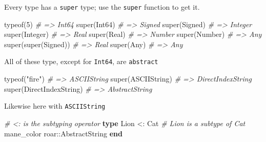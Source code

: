 \documentclass[ignorenonframetext,]{beamer}
\newenvironment{Shaded}{}{}
\newcommand{\KeywordTok}[1]{\textcolor[rgb]{0.00,0.44,0.13}{\textbf{{#1}}}}
\newcommand{\DataTypeTok}[1]{\textcolor[rgb]{0.56,0.13,0.00}{{#1}}}
\newcommand{\FloatTok}[1]{\textcolor[rgb]{0.25,0.63,0.44}{{#1}}}
\newcommand{\StringTok}[1]{\textcolor[rgb]{0.25,0.44,0.63}{{#1}}}
\newcommand{\CommentTok}[1]{\textcolor[rgb]{0.38,0.63,0.69}{\textit{{#1}}}}
\newcommand{\NormalTok}[1]{{#1}}
\begin{document}
\begin{frame}[fragile]{Every type has a \texttt{super} type; use the
\texttt{super} function to get it.}

\begin{Shaded}
\begin{Highlighting}[]
\NormalTok{typeof(}\FloatTok{5}\NormalTok{) }\CommentTok{# => Int64}
\NormalTok{super(}\DataTypeTok{Int64}\NormalTok{) }\CommentTok{# => Signed}
\NormalTok{super(}\DataTypeTok{Signed}\NormalTok{) }\CommentTok{# => Integer}
\NormalTok{super(}\DataTypeTok{Integer}\NormalTok{) }\CommentTok{# => Real}
\NormalTok{super(}\DataTypeTok{Real}\NormalTok{) }\CommentTok{# => Number}
\NormalTok{super(}\DataTypeTok{Number}\NormalTok{) }\CommentTok{# => Any}
\NormalTok{super(super(}\DataTypeTok{Signed}\NormalTok{)) }\CommentTok{# => Real}
\NormalTok{super(}\DataTypeTok{Any}\NormalTok{) }\CommentTok{# => Any}
\end{Highlighting}
\end{Shaded}

\end{frame}

\begin{frame}[fragile]{All of these type, except for \texttt{Int64}, are
\texttt{abstract}}

\begin{Shaded}
\begin{Highlighting}[]
\NormalTok{typeof(}\StringTok{"fire"}\NormalTok{) }\CommentTok{# => ASCIIString}
\NormalTok{super(}\DataTypeTok{ASCIIString}\NormalTok{) }\CommentTok{# => DirectIndexString}
\NormalTok{super(DirectIndexString) }\CommentTok{# => AbstractString}
\end{Highlighting}
\end{Shaded}

\end{frame}

\begin{frame}[fragile]{Likewise here with \texttt{ASCIIString}}

\begin{Shaded}
\begin{Highlighting}[]
\CommentTok{# <: is the subtyping operator}
\KeywordTok{type} \NormalTok{Lion <: Cat }\CommentTok{# Lion is a subtype of Cat}
  \NormalTok{mane_color}
  \NormalTok{roar::AbstractString}
\KeywordTok{end}
\end{Highlighting}
\end{Shaded}

\end{frame}
\end{document}
